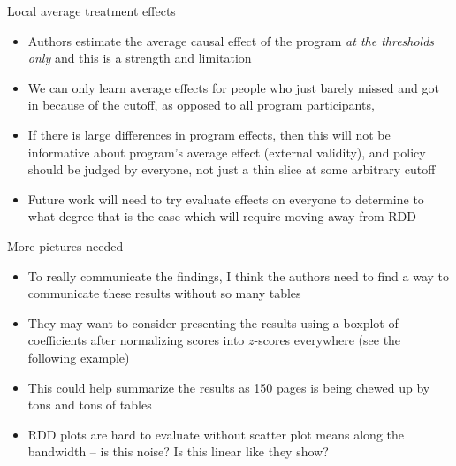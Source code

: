 \documentclass{beamer}
\begin{document}
\begin{frame}{Local average treatment effects}

\begin{itemize}
\item Authors estimate the average causal effect of the program \emph{at the thresholds only} and this is a strength and limitation
\item We can only learn average effects for people who just barely missed and got in because of the cutoff, as opposed to all program participants, 
\item If there is large differences in program effects, then this will not be informative about program's average effect (external validity), and policy should be judged by everyone, not just a thin slice at some arbitrary cutoff
\item Future work will need to try evaluate effects on everyone to determine to what degree that is the case which will require moving away from RDD 
\end{itemize}

\end{frame}


\begin{frame}{More pictures needed}

\begin{itemize}
\item To really communicate the findings, I think the authors need to find a way to communicate these results without so many tables
\item They may want to consider presenting the results using a boxplot of coefficients after normalizing scores into $z$-scores everywhere (see the following example)
\item This could help summarize the results as 150 pages is being chewed up by tons and tons of tables
\item RDD plots are hard to evaluate without scatter plot means along the bandwidth -- is this noise? Is this linear like they show?

\end{itemize}

\end{frame}
\end{document}

